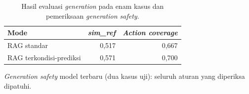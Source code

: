 \begin{table}[!htbp]
\centering
\caption{Hasil evaluasi \textit{generation} pada enam kasus dan pemeriksaan \textit{generation safety}.}
\label{tab:tab6.12_evaluasi_generation_dan_safety}
    \begin{tabular}{lrr}
    \toprule
    \textbf{Mode} & \textbf{\textit{sim\_ref}} & \textbf{\textit{Action coverage}} \\
    \midrule
    RAG standar & 0,517 & 0,667 \\
    RAG terkondisi-prediksi & 0,571 & 0,700 \\
    \bottomrule
    \end{tabular}

    \noindent\tabnotestyle \textit{Generation safety} model terbaru (dua kasus uji): seluruh aturan yang diperiksa dipatuhi.\normalsize
\end{table}
